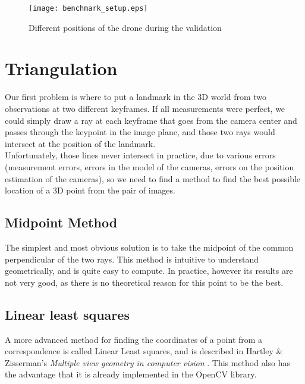 \begin{figure}[H]
  \centering
  \texttt{[image: benchmark\_setup.eps]}
  \caption{Different positions of the drone during the validation}
  \label{fig:benchmarksetup}
\end{figure}


\section{Triangulation}
Our first problem is where to put a landmark in the 3D world from two observations at two different keyframes. If all measurements were perfect, we could simply draw a ray at each keyframe that goes from the camera center and passes through the keypoint in the image plane, and those two rays would intersect at the position of the landmark. \\
Unfortunately, those lines never intersect in practice, due to various errors (measurement errors, errors in the model of the cameras, errors on the position estimation of the cameras), so we need to find a method to find the best possible location of a 3D point from the pair of images.

\subsection{Midpoint Method}
The simplest and most obvious solution is to take the midpoint of the common perpendicular of the two rays. This method is intuitive to understand geometrically, and is quite easy to compute. In practice, however its results are not very good, as there is no theoretical reason for this point to be the best.

\subsection{Linear least squares}
A more advanced method for finding the coordinates of a point from a correspondence is called Linear Least squares, and is described in Hartley \& Zisserman's \textit{Multiple view geometry in computer vision} \cite{multipleviewgeometry}.
This method also has the advantage that it is already implemented in the OpenCV library.


